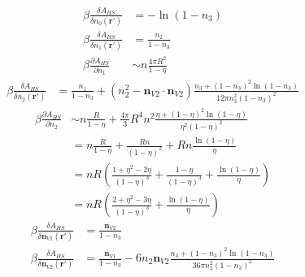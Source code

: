 \documentclass[letterpaper,twocolumn,amsmath,amssymb,prb]{revtex4-1}
\begin{document}
\begin{align}
    \beta\frac{\delta A_{HS}}{\delta n_0(\mathbf{r}')} &= -\ln(1-n_3)
    \\
    \beta\frac{\delta A_{HS}}{\delta n_1(\mathbf{r}')} &= \frac{n_2}{1-n_3}
    \\
    \beta\frac{\partial A_{HS}}{\partial n_1}
    &\sim n \frac{4\pi R^2}{1-\eta}
\end{align}
\begin{align}
    \beta\frac{\delta A_{HS}}{\delta n_2(\mathbf{r}')} &=
      \frac{n_1}{1-n_3}
      + (n_2^2 - \mathbf{n}_{V2}\cdot\mathbf{n}_{V2})\frac{n_3 +
        (1-n_3)^2\ln(1-n_3)}{
        12\pi n_3^2(1-n_3)^2
      }
\end{align}
\begin{align}
    \beta\frac{\partial A_{HS}}{\partial n_2}
    &\sim n\frac{R}{1-\eta} +
    \frac{4\pi}{3} R^4 n^2 \frac{\eta + (1-\eta)^2\ln(1-\eta)}{\eta^2(1-\eta)^2}
    \\
    &= n\frac{R}{1-\eta} +
    \frac{R n}{(1-\eta)^2}
    + Rn \frac{\ln(1-\eta)}{\eta}
    \\
    &= nR\left( \frac{1 + \eta^2  - 2\eta}{(1-\eta)^3} +
      \frac{1 - \eta}{(1-\eta)^3}
    + \frac{\ln(1-\eta)}{\eta}
    \right)
    \\
    &= nR\left( \frac{2 + \eta^2  - 3\eta}{(1-\eta)^3}
    + \frac{\ln(1-\eta)}{\eta}
    \right)
\end{align}
\begin{align}
    \beta\frac{\delta A_{HS}}{\delta \mathbf{n}_{V1}(\mathbf{r}')} &=
      \frac{\mathbf{n}_{V2}}{1-n_3}
    \\
    \beta\frac{\delta A_{HS}}{\delta \mathbf{n}_{V2}(\mathbf{r}')} &=
      \frac{\mathbf{n}_{V1}}{1-n_3}
      - 6 n_2 \mathbf{n}_{V2} \frac{n_3 +
        (1-n_3)^2\ln(1-n_3)}{
        36\pi n_3^2(1-n_3)^2
      }
  \end{align}
\end{document}
